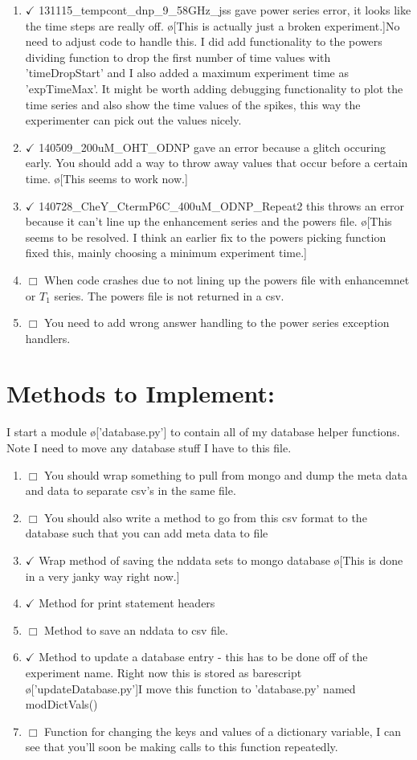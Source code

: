\documentclass[10pt]{book}
\begin{document}
\begin{enumerate}
    \item $\checkmark$ 131115_tempcont_dnp_9_58GHz_jss gave power series error, it looks like the time steps are really off. \o[This is actually just a broken experiment.]{No need to adjust code to handle this. I did add functionality to the powers dividing function to drop the first number of time values with 'timeDropStart' and I also added a maximum experiment time as 'expTimeMax'. It might be worth adding debugging functionality to plot the time series and also show the time values of the spikes, this way the experimenter can pick out the values nicely.}
    \item $\checkmark$ 140509_200uM_OHT_ODNP gave an error because a glitch occuring early. You should add a way to throw away values that occur before a certain time. \o[This seems to work now.]{}
    \item $\checkmark$ 140728_CheY_CtermP6C_400uM_ODNP_Repeat2 this throws an error because it can't line up the enhancement series and the powers file. \o[This seems to be resolved. I think an earlier fix to the powers picking function fixed this, mainly choosing a minimum experiment time.]{}
    \item $\Box$ When code crashes due to not lining up the powers file with enhancemnet or $T_1$ series. The powers file is not returned in a csv.
    \item $\Box$ You need to add wrong answer handling to the power series exception handlers.
\end{enumerate}
\section{Methods to Implement:}
I start a module \o['database.py']{} to contain all of my database helper functions. Note I need to move any database stuff I have to this file.

\begin{enumerate}
    \item $\Box$ You should wrap something to pull from mongo and dump the meta data and data to separate csv's in the same file.
    \item $\Box$ You should also write a method to go from this csv format to the database such that you can add meta data to file
    \item $\checkmark$ Wrap method of saving the nddata sets to mongo database \o[This is done in a very janky way right now.]{}
    \item $\checkmark$ Method for print statement headers
    \item $\Box$ Method to save an nddata to csv file.
    \item $\checkmark$ Method to update a database entry - this has to be done off of the experiment name. Right now this is stored as barescript \o['updateDatabase.py']{I move this function to 'database.py' named modDictVals()}
    \item $\Box$ Function for changing the keys and values of a dictionary variable, I can see that you'll soon be making calls to this function repeatedly.
\end{enumerate}
\end{document}
